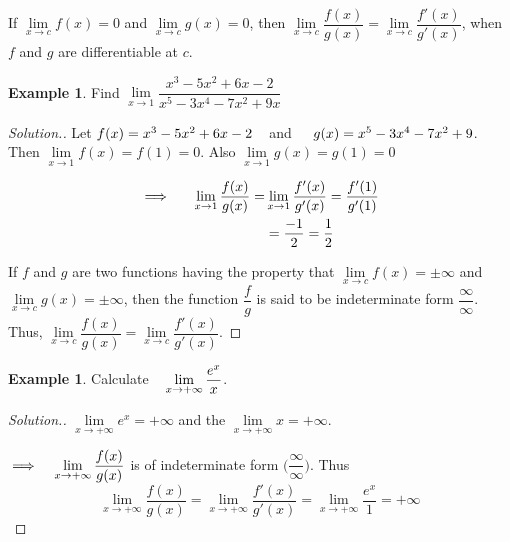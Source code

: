\documentclass[11pt,a4paper]{article}
\theoremstyle{definition}
\newtheorem{exa}[thm]{Example}
\newenvironment{solution}
  {\renewcommand{\qedsymbol}{}\begin{proof}[\textit{Solution}.]}
  {\end{proof}}
\begin{document}
If $\lim\limits_{x\rightarrow c}f(x) =0$ and $\lim\limits_{x\rightarrow c}g(x) = 0$, then $\lim\limits_{x\rightarrow c}\dfrac{f(x)}{g(x)} = \lim\limits_{x\rightarrow c}\dfrac{f'(x)}{g'(x)}$, when $f$ and $g$ are differentiable at $c$.


\begin{exa}


Find $\lim\limits_{x\rightarrow 1}\dfrac{x^3-5x^2 + 6x - 2 }{x^5 -3x^4 - 7x^2 + 9x}$
\end{exa}


\begin{solution}


Let $f(x) = x^3 - 5x^2 + 6x - 2\hspace{0.3cm}$ and $\hspace{0.4cm} g(x) = x^5 - 3x^4 - 7x^2 + 9$. Then $\lim\limits_{x\rightarrow 1}f(x) = f(1) = 0$. Also $\lim\limits_{x\rightarrow 1}g(x) = g(1) = 0$

\begin{align*}
\implies\hspace{0.5cm} \lim\limits_{x\rightarrow 1}\dfrac{f(x)}{g(x)}= & \lim\limits_{x\rightarrow 1}\dfrac{f'(x)}{g'(x)} = \dfrac{f'(1)}{g'(1)}\\
& = \dfrac{-1}{2}=\dfrac{1}{2}\\ 
\end{align*}

If $f$ and $g$ are two functions having the property that $\lim\limits_{x\rightarrow c}f(x) = \pm \infty$ and $\lim\limits_{x\rightarrow c}g(x) = \pm \infty$, then the function $\dfrac{f}{g}$ is said to be indeterminate form $\dfrac{\infty}{\infty}$. Thus,  $\lim\limits_{x\rightarrow c}\dfrac{f(x)}{g(x)} = \lim\limits_{x\rightarrow c}\dfrac{f'(x)}{g'(x)}$.
\end{solution}


\begin{exa}


Calculate $\hspace{0.3cm}\lim\limits_{x\rightarrow +\infty}\dfrac{e^x}{x}$.
\end{exa}


\begin{solution}


$\lim\limits_{x\rightarrow +\infty} e^x = + \infty$ and the $\lim\limits_{x\rightarrow +\infty}x = +\infty$.


$\implies \hspace{0.3cm} \lim\limits_{x\rightarrow +\infty}\dfrac{f(x)}{g(x)}$ is of indeterminate form $\Big(\dfrac{\infty}{\infty}\Big)$. Thus 
$$\lim\limits_{x\rightarrow +\infty}\dfrac{f(x)}{g(x)} = \lim\limits_{x\rightarrow +\infty}\dfrac{f'(x)}{g'(x)} = \lim\limits_{x\rightarrow +\infty}\frac{e^x}{1} = +\infty$$
\end{solution}
\end{document}
